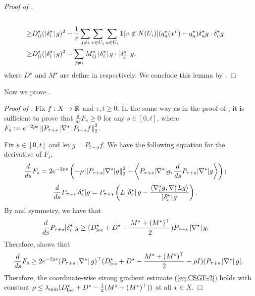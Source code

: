 \begin{proof}[Proof of ]
\begin{align}
        \\\geq & D^\star_{ii}(\abs{\delta_i^\star} g)^2 - \frac{1}{r}\sum_{j\neq i}\sum_{v\in U_j}\sum_{u\in U_i}\ind[v\notin N(U_i)](q_u^\star(x^v)-q_u^\star) \delta^\star_u g \cdot \delta^\star_v g \nonumber
        \\\geq &D^\star_{ii}(\abs{\delta_i^\star} g)^2 - \sum_{j\neq i} M^\star_{ij} \abs{\delta_i^\star} g\cdot \abs{\delta_j^\star} g , \label{eq:non-local_term_Sgraph}
    \end{align}
    where $D^\star$ and $M^\star$ are define in  respectively.
    We conclude this lemma by .
\end{proof}

Now we prove .
\begin{proof}[Proof of ]
    Fix $f: X \to \R$ and $\tau, t\geq 0$.
    In the same way as in the proof of , it is sufficient to prove that $\frac d{ds}F_s \geq 0$ for any $s\in [0,t]$, where $F_s := e^{-2\rho s}\norm{P_{\tau+s}\abs{\nabla^\star}P_{t-s}f}_2^2$.

    Fix $s\in [0,t]$ and let $g = P_{t-s}f$.
    We have the following equation for the derivative of $F_s$,
    \begin{align}
        \frac d{ds} F_s &= 2 e^{-2\rho s} \left( - \rho \norm{P_{\tau+s} |\grad^\star| g}_2^2 
        + \inner{P_{\tau+s} |\grad^\star| g}{\frac{d}{ds} P_{\tau+s} |\grad^\star| g}
        \right) ;
        \label{eq:CSGE_potential_function_derivative-SGraph}
    \end{align}
    \begin{align}\nonumber
        \frac d{ds} P_{\tau+s} |\delta^\star_i| g
        &= P_{\tau+s} \left( L \abs{\delta^\star_i} g -  \frac{\inner{\grad_i^\star g}{\grad_i^\star L g}}{\abs{\delta^\star_i} g}\right).
    \end{align}
    By  and symmetry, we have that 
    \begin{align}
    \label{eq:derivative-CSGE-Sgraph}
        \frac d{ds} P_{\tau+s} |\delta^\star_i| g
        &\geq (D^\star_{\-{loc}}+D^\star - \frac{M^\star + (M^\star)^\top}2)P_{\tau+s}\abs{\nabla^\star}g .
    \end{align}
    Therefore,  shows that
    $$
        \frac d{ds} F_s \geq 2 e^{-2\rho s} (P_{\tau+s}\abs{\nabla^\star}g)^\top  (D^\star_{\-{loc}}+D^\star - \frac{M^\star + (M^\star)^\top}2 - \rho I)(P_{\tau+s}\abs{\nabla^\star}g) .
    $$
    Therefore, the coordinate-wise strong gradient estimate (\ref{eq:CSGE-2}) holds with constant $\rho \leq \lambda_{\min}(D_{\-{loc}}^\star+D^\star - \frac{1}{2}(M^\star+(M^\star)^\top))$ at all $x \in X$.
\end{proof}


